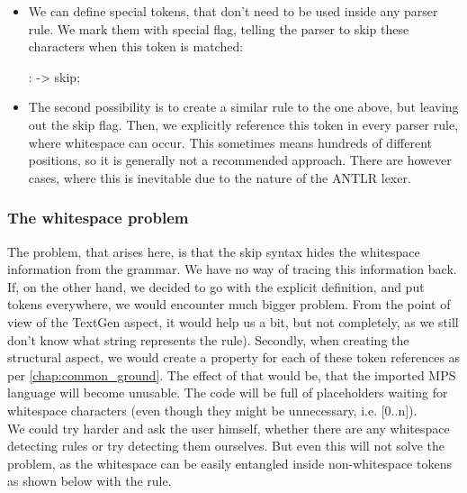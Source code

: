 \begin{itemize}
	\item We can define special tokens, that don't need to be used inside any parser rule.
	We mark them with special flag, telling the parser to skip these characters when this token is matched:

	\begin{antlr}
		   :     -> skip;
	\end{antlr}

	\item The second possibility is to create a similar rule to the one above, but leaving out the skip flag.
	Then, we explicitly reference this token in every parser rule, where whitespace can occur.
	This sometimes means hundreds of different positions, so it is generally not a recommended approach.
	There are however cases, where this is inevitable due to the nature of the ANTLR lexer.
\end{itemize}

\subsubsection{The whitespace problem}

The problem, that arises here, is that the skip syntax hides the whitespace information from the grammar.
We have no way of tracing this information back.
If, on the other hand, we decided to go with the explicit definition, and put  tokens everywhere, we would encounter much bigger problem.
From the point of view of the TextGen aspect, it would help us a bit, but not completely, as we still don't know what string represents the rule).
Secondly, when creating the structural aspect, we would create a property for each of these token references as per \ref{chap:common_ground}.
The effect of that would be, that the imported MPS language will become unusable.
The code will be full of placeholders waiting for whitespace characters (even though they might be unnecessary, i.e. [0..n]).
\\

We could try harder and ask the user himself, whether there are any whitespace detecting rules or try detecting them ourselves.
But even this will not solve the problem, as the whitespace can be easily entangled inside non-whitespace tokens as shown below with the  rule.
\\

